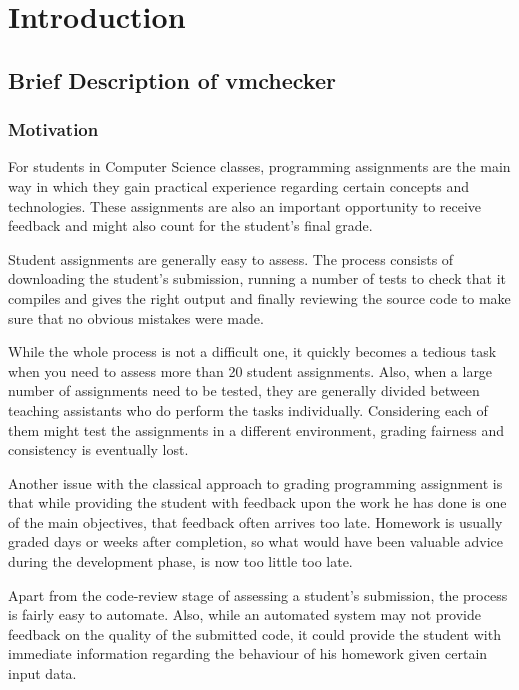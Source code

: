 \chapter{Introduction}
\label{chapter:intro}

\section{Brief Description of vmchecker}
\label{sec:vmc-history}

\subsection{Motivation}
\label{sub-sec:vmc-history-motiv}

For students in Computer Science classes, programming assignments are the main
way in which they gain practical experience regarding certain concepts and 
technologies. These assignments are also an important opportunity to receive 
feedback and might also count for the student's final grade.

Student assignments are generally easy to assess. The process consists of 
downloading the student's submission, running a number of tests to check that 
it compiles and gives the right output and finally reviewing the source code
to make sure that no obvious mistakes were made.

While the whole process is not a difficult one, it quickly becomes a tedious task
when you need to assess more than 20 student assignments. Also, when a large number
of assignments need to be tested, they are generally divided between teaching 
assistants who do perform the tasks individually. Considering each of them might
test the assignments in a different environment, grading fairness and consistency
is eventually lost.

Another issue with the classical approach to grading programming assignment is that
while providing the student with feedback upon the work he has done is one of the
main objectives, that feedback often arrives too late. Homework is usually graded
days or weeks after completion, so what would have been valuable advice during the
development phase, is now too little too late.

Apart from the code-review stage of assessing a student's submission, the process is 
fairly easy to automate. Also, while an automated system may not provide feedback 
on the quality of the submitted code, it could provide the student with immediate
information regarding the behaviour of his homework given certain input data.

